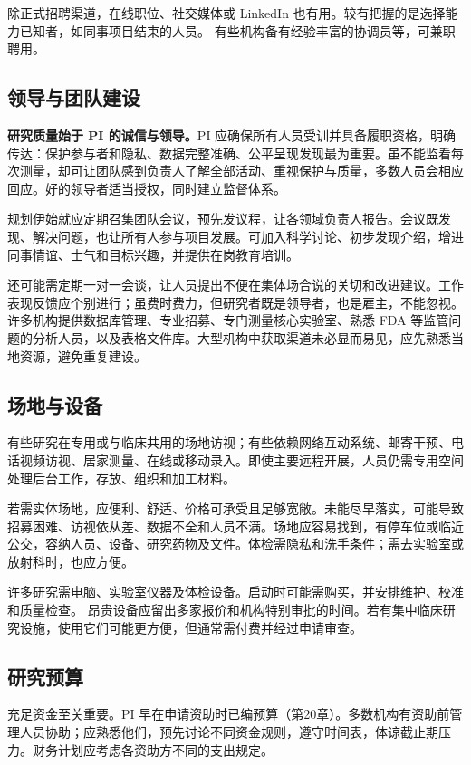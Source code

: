 除正式招聘渠道，在线职位、社交媒体或 LinkedIn 也有用。较有把握的是选择能力已知者，如同事项目结束的人员。
有些机构备有经验丰富的协调员等，可兼职聘用。

\subsection{领导与团队建设}
\textbf{研究质量始于 PI 的诚信与领导。}PI 应确保所有人员受训并具备履职资格，明确传达：保护参与者和隐私、数据完整准确、公平呈现发现最为重要。虽不能监看每次测量，却可让团队感到负责人了解全部活动、重视保护与质量，多数人员会相应回应。好的领导者适当授权，同时建立监督体系。

规划伊始就应定期召集团队会议，预先发议程，让各领域负责人报告。会议既发现、解决问题，也让所有人参与项目发展。可加入科学讨论、初步发现介绍，增进同事情谊、士气和目标兴趣，并提供在岗教育培训。

还可能需定期一对一会谈，让人员提出不便在集体场合说的关切和改进建议。工作表现反馈应个别进行；虽费时费力，但研究者既是领导者，也是雇主，不能忽视。
许多机构提供数据库管理、专业招募、专门测量核心实验室、熟悉 FDA 等监管问题的分析人员，以及表格文件库。大型机构中获取渠道未必显而易见，应先熟悉当地资源，避免重复建设。

\subsection{场地与设备}
有些研究在专用或与临床共用的场地访视；有些依赖网络互动系统、邮寄干预、电话视频访视、居家测量、在线或移动录入。即使主要远程开展，人员仍需专用空间处理后台工作，存放、组织和加工材料。

若需实体场地，应便利、舒适、价格可承受且足够宽敞。未能尽早落实，可能导致招募困难、访视依从差、数据不全和人员不满。场地应容易找到，有停车位或临近公交，容纳人员、设备、研究药物及文件。体检需隐私和洗手条件；需去实验室或放射科时，也应方便。

许多研究需电脑、实验室仪器及体检设备。启动时可能需购买，并安排维护、校准和质量检查。
昂贵设备应留出多家报价和机构特别审批的时间。若有集中临床研究设施，使用它们可能更方便，但通常需付费并经过申请审查。

\subsection{研究预算}
充足资金至关重要。PI 早在申请资助时已编预算（第20章）。多数机构有资助前管理人员协助；应熟悉他们，预先讨论不同资金规则，遵守时间表，体谅截止期压力。财务计划应考虑各资助方不同的支出规定。

